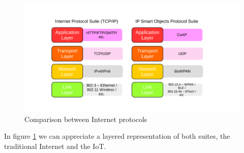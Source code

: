 \begin{figure}[htb]
	\centering
	\includegraphics[width=0.95\columnwidth]{chapters/background.images/Layers.pdf}
	\caption{Comparison between Internet protocols}
	\label{fig:IPLayers}
\end{figure}

In figure \ref{fig:IPLayers} we can appreciate a layered representation of both suites, the traditional Internet and the IoT.




